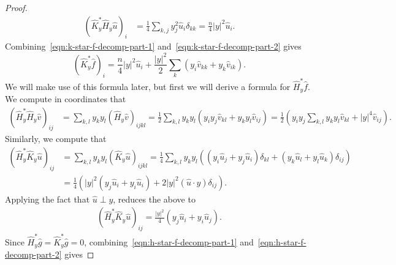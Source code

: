 \documentclass[11pt]{article}
\newcommand{\abs}[1]{\lvert #1 \rvert}
\begin{document}
\begin{proof}
\begin{equation}
\label{eqn:k-star-f-decomp-part-2}
\begin{split}
(\widehat{K}^*_y\widehat{H}_y\widehat u)_i
&=
\frac14
\sum_{k,j}
y^2_j\widehat u_i\delta_{kk}=
\frac{n}{4}
\abs{y}^2
\widehat u_i.
\end{split}
\end{equation}
Combining~\eqref{eqn:k-star-f-decomp-part-1} and~\eqref{eqn:k-star-f-decomp-part-2} gives
\begin{equation}
\label{eqn:hat-k-f}
(\widehat{K}^*_y\widehat f)_i
=
\frac{n}{4}
\abs{y}^2
\widehat u_i
+
\frac{\abs{y}^2}{2}
\sum_{k}
\left(
y_i\widehat v_{kk}
+
y_k\widehat v_{ik}
\right).
\end{equation}
We will make use of this formula later, but first we will derive a formula for $\widehat{H}^*_y\widehat f$. We compute in coordinates that
\begin{equation}
\label{eqn:h-star-f-decomp-part-1}
\begin{split}
(\widehat{H}^*_y\widehat{H}_y\widehat v)_{ij}
&=
\sum_{k,l}
y_ky_l(\widehat{H}_y\widehat v)_{ijkl}
=
\frac12
\sum_{k,l}
y_ky_l
\left(
y_iy_j\widehat v_{kl}
+
y_ky_l\widehat v_{ij}
\right)
=
\frac12
\left(
y_iy_j
\sum_{k,l}
y_ky_l\widehat v_{kl}
+
\abs{y}^4
\widehat v_{ij}
\right)
.
\end{split}
\end{equation}
Similarly, we compute that
\begin{equation}
\begin{split}
(\widehat{H}^*_y\widehat{K}_y\widehat u)_{ij}
&=
\sum_{k,l}
y_ky_l
(\widehat{K}_y\widehat u)_{ijkl}
=
\frac{1}{4}
\sum_{k,l}
y_ky_l
\left(
(y_i\widehat u_j + y_j\widehat u_i)\delta_{kl}
+
(y_k\widehat u_l + y_l\widehat u_k)\delta_{ij}
\right)
\\
&=
\frac{1}{4}
\left(
\abs{y}^2
(y_j\widehat u_i + y_i\widehat u_i)
+
2
\abs{y}^2
(\widehat u \cdot y)
\delta_{ij}
\right).
\end{split}
\end{equation}
Applying the fact that $\widehat u \perp y$, reduces the above to
\begin{equation}
\label{eqn:h-star-f-decomp-part-2}
\begin{split}
(\widehat{H}^*_y\widehat{K}_y\widehat u)_{ij}
=
\frac{\abs{y}^2}{4}
\left(
y_j\widehat u_i+y_i\widehat u_j
\right).
\end{split}
\end{equation}
Since $\widehat{H}^*_y\widehat g = \widehat{K}^*_y\widehat g = 0$,  combining~\eqref{eqn:h-star-f-decomp-part-1} and~\eqref{eqn:h-star-f-decomp-part-2} gives

\end{proof}
\end{document}
